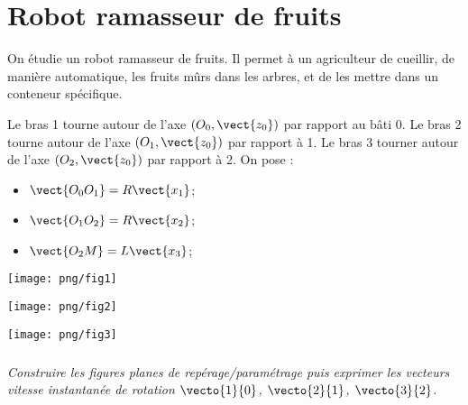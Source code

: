 \documentclass[10pt,oneside]{article}
\begin{document}
\section*{Robot ramasseur de fruits} 
On étudie un robot ramasseur de fruits. Il permet à un agriculteur de cueillir, de manière automatique, les fruits mûrs dans les arbres, et de les mettre dans un conteneur spécifique. 

Le bras 1 tourne autour de l'axe $(O_0,\vect{z_0})$ par rapport au bâti 0. Le bras 2 tourne autour de l'axe $(O_1,\vect{z_0})$ par rapport à 1. Le bras 3 tourner autour de l'axe $(O_2,\vect{z_0})$ par rapport à 2. On pose :
\begin{itemize}
\item $\vect{O_0O_1} = R\vect{x_1}$;
\item $\vect{O_1O_2} = R\vect{x_2}$;
\item $\vect{O_2M} = L\vect{x_3}$;
\end{itemize}

\begin{minipage}[c]{.47\linewidth}
\begin{center}
\texttt{[image: png/fig1]}
\end{center}
\end{minipage}\hfill
\begin{minipage}[c]{.47\linewidth}
\begin{center}
\texttt{[image: png/fig2]}
\end{center}
\end{minipage}

\begin{center}
\texttt{[image: png/fig3]}
\end{center}

\subparagraph{}
\textit{Construire les figures planes de repérage/paramétrage puis exprimer les vecteurs vitesse instantanée de rotation $\vecto{1}{0}$, $\vecto{2}{1}$, $\vecto{3}{2}$.} 
\end{document}
